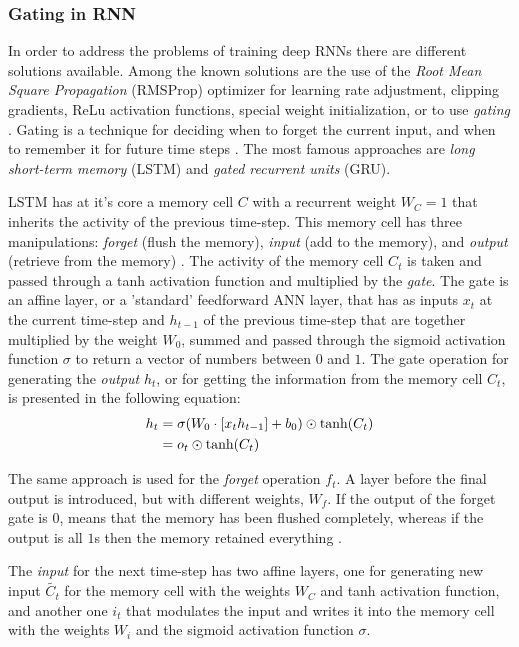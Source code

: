 \subsubsection{Gating in RNN}
In order to address the problems of training deep RNNs there are different solutions available. Among the known solutions are the use of the \textit{Root Mean Square Propagation} (RMSProp) optimizer for learning rate adjustment, clipping gradients, ReLu activation functions, special weight initialization, or to use \textit{gating} \cite{NeonRNN}. Gating is a technique for deciding when to forget the current input, and when to remember it for future time steps \cite{RNNvideo}. The most famous approaches are \textit{long short-term memory} (LSTM) and \textit{gated recurrent units} (GRU).

LSTM has at it's core a memory cell $C$ with a recurrent weight $W_{C}=1$ that inherits the activity of the previous time-step. This memory cell has three manipulations: \textit{forget} (flush the memory), \textit{input} (add to the memory), and \textit{output} (retrieve from the memory) \cite{NeonRNN}. The activity of the memory cell $C_{t}$ is taken and passed through a tanh activation function and multiplied by the \textit{gate}. The gate is an affine layer, or a 'standard' feedforward ANN layer, that has as inputs $x_{t}$ at the current time-step and $h_{t-1}$ of the previous time-step that are together multiplied by the weight $W_{0}$, summed and passed through the sigmoid activation function $\sigma$ to return a vector of numbers between $0$ and $1$. The gate operation for generating the \textit{output} $h_{t}$, or for getting the information from the memory cell $C_{t}$, is presented in the following equation:
\begin{equation}\label{gate}
\begin{split}
h_{t}&=\sigma(W_{0}\cdot \left [ x_{t} h_{t-1} \right ]+b_{0})\odot \textup{tanh}(C_{t})\\
&=o_{t}\odot \textup{tanh}(C_{t})
\end{split}
\end{equation}

The same approach is used for the \textit{forget} operation $f_{t}$. A layer before the final output is introduced, but with different weights, $W_{f}$. If the output of the forget gate is $0$, means that the memory has been flushed completely, whereas if the output is all $1$s then the memory retained everything \cite{NeonRNN}. 

The \textit{input} for the next time-step has two affine layers, one for generating new input $\widetilde{C_{t}}$ for the memory cell with the weights $W_{C}$ and tanh activation function, and another one $i_{t}$ that modulates the input and writes it into the memory cell with the weights $W_{i}$ and the sigmoid activation function $\sigma$. 

